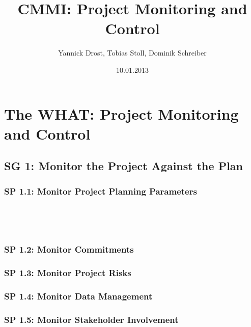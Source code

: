 \documentclass[accentcolor=tud1b]{tudbeamer}
\title{CMMI: Project Monitoring and Control}
\author{Yannick Drost, Tobias Stoll, Dominik Schreiber}
\date{10.01.2013}
\newcommand{\strong}[1]{\textaccentcolor{\textsf{\textbf{#1}}}}
\newenvironment{tframe}{
	\begin{frame}
	\frametitle{\ifnum\Level=2\insertsectionhead\fi\ifnum\Level=3\insertsectionhead\\\strong{\insertsubsectionhead}\fi\ifnum\Level=4\insertsubsectionhead\\\strong{\insertsubsubsectionhead}\fi
	}
}{
	\end{frame}
}
\begin{document}
\begin{titleframe}
\end{titleframe}

\section{The WHAT: Project Monitoring and Control}
\begin{frame}

\cite{cmmi2010cmmidevelopment13}

\end{frame}


\subsection{SG 1: Monitor the Project Against the Plan}

\subsubsection{SP 1.1: Monitor Project Planning Parameters}
\begin{tframe}

\end{tframe}

\subsubsection{SP 1.2: Monitor Commitments}

\subsubsection{SP 1.3: Monitor Project Risks}

\subsubsection{SP 1.4: Monitor Data Management}

\subsubsection{SP 1.5: Monitor Stakeholder Involvement}
\end{document}
